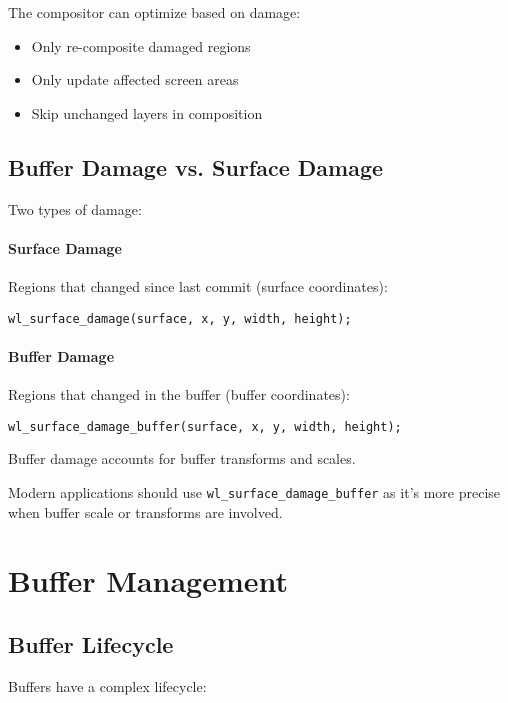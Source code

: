The compositor can optimize based on damage:
\begin{itemize}
    \item Only re-composite damaged regions
    \item Only update affected screen areas
    \item Skip unchanged layers in composition
\end{itemize}

\subsection{Buffer Damage vs. Surface Damage}

Two types of damage:

\paragraph{Surface Damage}
Regions that changed since last commit (surface coordinates):
\begin{lstlisting}[style=cstyle]
wl_surface_damage(surface, x, y, width, height);
\end{lstlisting}

\paragraph{Buffer Damage}
Regions that changed in the buffer (buffer coordinates):
\begin{lstlisting}[style=cstyle]
wl_surface_damage_buffer(surface, x, y, width, height);
\end{lstlisting}

Buffer damage accounts for buffer transforms and scales.

\begin{notebox}
Modern applications should use \texttt{wl\_surface\_damage\_buffer} as it's more precise when buffer scale or transforms are involved.
\end{notebox}

\section{Buffer Management}

\subsection{Buffer Lifecycle}

Buffers have a complex lifecycle:

